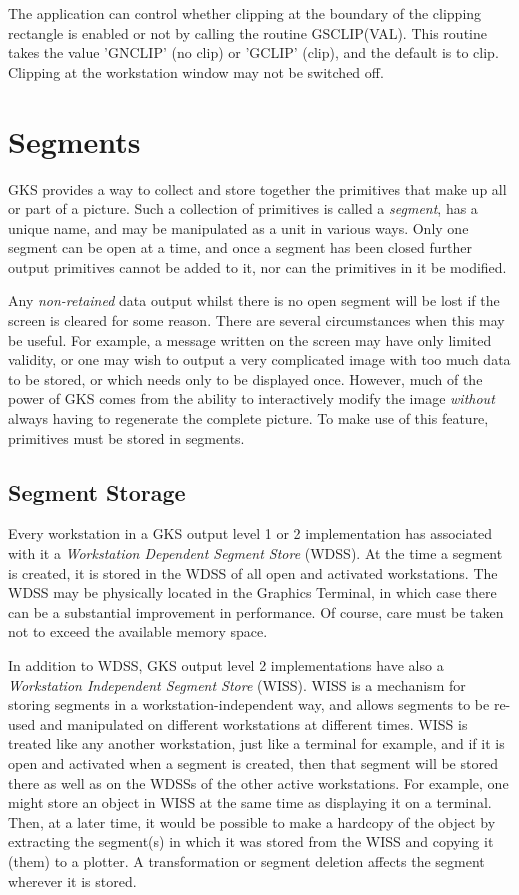 The application can control whether clipping at the boundary of the
clipping rectangle is enabled or not by calling the routine GSCLIP(VAL).
This routine takes the value 'GNCLIP' (no clip) or 'GCLIP' (clip),
and the default is to clip.
Clipping at the workstation window may not be switched off.
\section{\protect\label{sec:seghdr}Segments}
 
GKS provides a way to collect and store together the primitives that
make up all or part of a picture. Such a collection of primitives is
called a {\it segment}, has a unique name, and may be manipulated
as a unit in various ways.
Only one segment can be open at a time, and once a segment has
been closed further output primitives cannot be added to it,
nor can the primitives in it be modified.
 
Any {\it non-retained} data output whilst there is no open
segment will be lost if the screen is cleared for some reason.
There are several circumstances when this may be useful.
For example, a message written on the screen may have only limited
validity, or one may wish to output a very complicated image with
too much data to be stored, or which needs only to be displayed once.
However, much of the power of GKS comes from the ability to
interactively modify the image {\it without} always having
to regenerate the complete picture.
To make use of this feature, primitives must be stored in segments.
\subsection{Segment Storage}
 
Every workstation in a GKS output level 1 or 2 implementation has
associated with it a {\it Workstation Dependent Segment Store}
(WDSS). At the time a segment is created, it is stored in the WDSS of all
open and activated workstations.
The WDSS may be physically located in the Graphics Terminal,
in which case there can be a substantial improvement in performance.
Of course, care must be taken not to exceed the available memory space.
 
In addition to WDSS, GKS output level 2 implementations
have also a {\it Workstation Independent Segment Store} (WISS).
WISS is a mechanism for storing segments in a
workstation-independent way, and allows segments to be re-used
and manipulated on different workstations at different times.
WISS is treated like any another workstation, just like a terminal
for example, and if it is open and activated when a segment is created,
then that segment will be stored there
as well as on the WDSSs of the other active workstations.
For example, one might store an object in WISS at the same time
as displaying it on a terminal. Then, at a later time, it would
be possible to make a hardcopy of the object by extracting the segment(s)
in which it was stored from the WISS and copying it (them) to a plotter.
A transformation or segment deletion affects the segment wherever it is stored.
 
